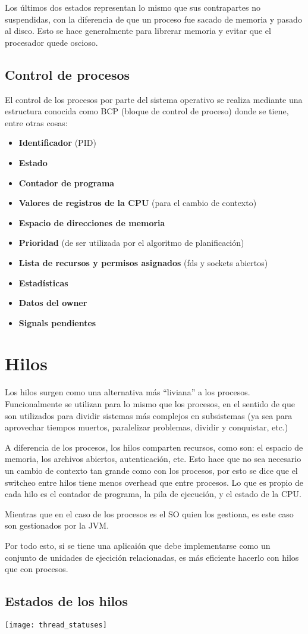 Los últimos dos estados representan lo mismo que sus contrapartes no suspendidas, con la diferencia de que un proceso fue sacado de memoria y pasado al disco. Esto se hace generalmente para librerar memoria y evitar que el procesador quede oscioso.

\subsection{Control de procesos}
El control de los procesos por parte del sistema operativo se realiza mediante una estructura conocida como BCP (bloque de control de proceso) donde se tiene, entre otras cosas:
\begin{itemize}
  \item \textbf{Identificador} (PID)
  \item \textbf{Estado}
  \item \textbf{Contador de programa}
  \item \textbf{Valores de registros de la CPU} (para el cambio de contexto)
  \item \textbf{Espacio de direcciones de memoria}
  \item \textbf{Prioridad} (de ser utilizada por el algoritmo de planificación)
  \item \textbf{Lista de recursos y permisos asignados} (fds y sockets abiertos)
  \item \textbf{Estadísticas}
  \item \textbf{Datos del owner}
  \item \textbf{Signals pendientes}
\end{itemize}

\section{Hilos}
Los hilos surgen como una alternativa más ``liviana'' a los procesos. Funcionalmente se utilizan para lo mismo que los procesos, en el sentido de que son utilizados para dividir sistemas más complejos en subsistemas (ya sea para aprovechar tiempos muertos, paralelizar problemas, dividir y conquistar, etc.) 

A diferencia de los procesos, los hilos comparten recursos, como son: el espacio de memoria, los archivos abiertos, autenticación, etc. Esto hace que no sea necesario un cambio de contexto tan grande como con los procesos, por esto se dice que el switcheo entre hilos tiene menos overhead que entre procesos. Lo que es propio de cada hilo es el contador de programa, la pila de ejecución, y el estado de la CPU.

Mientras que en el caso de los procesos es el SO quien los gestiona, es este caso son gestionados por la JVM.

Por todo esto, si se tiene una aplicaión que debe implementarse como un conjunto de unidades de ejecición relacionadas, es más eficiente hacerlo con hilos que con procesos.

\subsection{Estados de los hilos}
\texttt{[image: thread\_statuses]}
